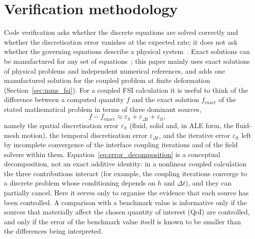 \section{Verification methodology}\label{sec:verification_methodology}

Code verification asks whether the discrete equations are solved correctly and whether the discretisation error vanishes at the expected rate; it does not ask whether the governing equations describe a physical system~\citep{Roache1998, Roy2005, Oberkampf2008, Oberkampf2010}. Exact solutions can be manufactured for any set of equations~\citep{Roache2002}; this paper mainly uses exact solutions of physical problems and independent numerical references, and adds one manufactured solution for the coupled problem at finite deformation (Section~\ref{sec:mms_fsi}).
For a coupled FSI calculation it is useful to think of the difference between a computed quantity $f$ and the exact solution $f_\mathrm{exact}$ of the stated mathematical problem in terms of three dominant sources,
\begin{equation}
	f - f_\mathrm{exact} \approx \varepsilon_h + \varepsilon_{\Delta t} + \varepsilon_\mathrm{it},
	\label{eq:error_decomposition}
\end{equation}
namely the spatial discretisation error $\varepsilon_h$ (fluid, solid and, in ALE form, the fluid-mesh motion), the temporal discretisation error $\varepsilon_{\Delta t}$, and the iterative error $\varepsilon_\mathrm{it}$ left by incomplete convergence of the interface coupling iterations and of the field solvers within them.
Equation~\eqref{eq:error_decomposition} is a conceptual decomposition, not an exact additive identity: in a nonlinear coupled calculation the three contributions interact (for example, the coupling iterations converge to a discrete problem whose conditioning depends on $h$ and $\Delta t$), and they can partially cancel.
Here it serves only to organise the evidence that each source has been controlled.
A comparison with a benchmark value is informative only if the sources that materially affect the chosen quantity of interest (QoI) are controlled, and only if the error of the benchmark value itself is known to be smaller than the differences being interpreted.

